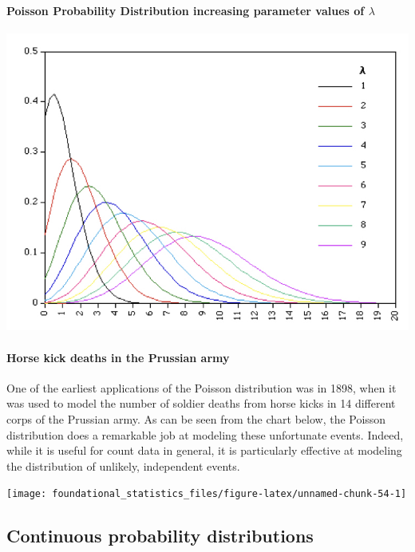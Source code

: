 \documentclass[]{book}
\let\oldparagraph\paragraph
\renewcommand{\paragraph}[1]{\oldparagraph{#1}\mbox{}}
\begin{document}
\hypertarget{poisson-probability-distribution-increasing-parameter-values-of-lambda}{%
\paragraph{\texorpdfstring{Poisson Probability Distribution \textbar{} increasing parameter values of \(\lambda\)}{Poisson Probability Distribution \textbar{} increasing parameter values of \textbackslash{}lambda}}\label{poisson-probability-distribution-increasing-parameter-values-of-lambda}}

\begin{center}\includegraphics[width=0.7\linewidth]{images/week_2.005} \end{center}

\hypertarget{horse-kick-deaths-in-the-prussian-army}{%
\paragraph{Horse kick deaths in the Prussian army}\label{horse-kick-deaths-in-the-prussian-army}}

One of the earliest applications of the Poisson distribution was in 1898, when it was used to model the number of soldier deaths from horse kicks in 14 different corps of the Prussian army. As can be seen from the chart below, the Poisson distribution does a remarkable job at modeling these unfortunate events. Indeed, while it is useful for count data in general, it is particularly effective at modeling the distribution of unlikely, independent events.

\begin{center}\texttt{[image: foundational\_statistics\_files/figure-latex/unnamed-chunk-54-1]} \end{center}

\hypertarget{continuous-probability-distributions}{%
\subsection{\texorpdfstring{\textbf{Continuous probability distributions}}{Continuous probability distributions}}\label{continuous-probability-distributions}}
\end{document}
